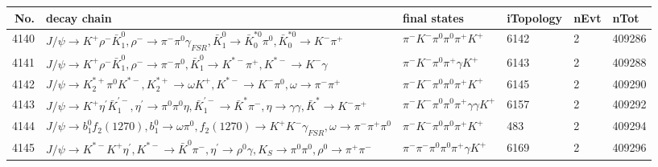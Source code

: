 \begin{table}[htbp] 
\begin{center}
\begin{small}
\begin{tabular}{rlllll}\hline\hline
 No. & decay chain & final states &  iTopology & nEvt & nTot \\\hline
4140&$J/\psi       \rightarrow K^{+}          \rho^{-}      \bar{K}_1^{0} , \rho^{-}       \rightarrow \pi^{-}        \pi^{0}        \gamma_{FSR} , \bar{K}_1^{0}  \rightarrow \bar{K}_0^{*0}\pi^{0}        , \bar{K}_0^{*0} \rightarrow K^{-}          \pi^{+}        $&$\pi^{-}        K^{-}          \pi^{0}        \pi^{0}        \pi^{+}        K^{+}          $& 6142&    2&409286\\
4141&$J/\psi       \rightarrow K^{+}          \rho^{-}      \bar{K}_1^{0} , \rho^{-}       \rightarrow \pi^{-}        \pi^{0}        , \bar{K}_1^{0}  \rightarrow K^{*-}         \pi^{+}        , K^{*-}          \rightarrow K^{-}          \gamma       $&$\pi^{-}        K^{-}          \pi^{0}        \pi^{+}        \gamma       K^{+}          $& 6143&    2&409288\\
4142&$J/\psi       \rightarrow K_2^{*+}       \pi^{0}        K^{*-}         , K_2^{*+}        \rightarrow \omega         K^{+}          , K^{*-}          \rightarrow K^{-}          \pi^{0}        , \omega          \rightarrow \pi^{-}        \pi^{+}        $&$\pi^{-}        K^{-}          \pi^{0}        \pi^{0}        \pi^{+}        K^{+}          $& 6145&    2&409290\\
4143&$J/\psi       \rightarrow K^{+}          \eta^{\prime} \bar{K}_1^{'-}, \eta^{\prime}  \rightarrow \pi^{0}        \pi^{0}        \eta          , \bar{K}_1^{'-} \rightarrow \bar{K}^{*}   \pi^{-}        , \eta           \rightarrow \gamma       \gamma       , \bar{K}^{*}    \rightarrow K^{-}          \pi^{+}        $&$\pi^{-}        K^{-}          \pi^{0}        \pi^{0}        \pi^{+}        \gamma       \gamma       K^{+}          $& 6157&    2&409292\\
4144&$J/\psi       \rightarrow b_{1}^{0}      f_{2}(1270)    , b_{1}^{0}       \rightarrow \omega         \pi^{0}        , f_{2}(1270)     \rightarrow K^{+}          K^{-}          \gamma_{FSR} , \omega          \rightarrow \pi^{-}        \pi^{+}        \pi^{0}        $&$\pi^{-}        K^{-}          \pi^{0}        \pi^{0}        \pi^{+}        K^{+}          $&  483&    2&409294\\
4145&$J/\psi       \rightarrow K^{*-}         K^{+}          \eta^{\prime} , K^{*-}          \rightarrow \bar{K}^{0}   \pi^{-}        , \eta^{\prime}  \rightarrow \rho^{0}      \gamma       , K_{S}           \rightarrow \pi^{0}        \pi^{0}        , \rho^{0}       \rightarrow \pi^{+}        \pi^{-}        $&$\pi^{-}        \pi^{-}        \pi^{0}        \pi^{0}        \pi^{+}        \gamma       K^{+}          $& 6169&    2&409296\\

\end{tabular}
\end{small}
\end{center}
\end{table}
